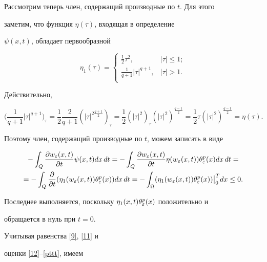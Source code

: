 \begin{pf}
Рассмотрим теперь член, содержащий производные по $t$. Для этого


заметим, что функция $\eta(\tau)$, входящая в определение


$\psi(x,t)$, обладает первообразной


$$


\eta_1(\tau)=


\begin{cases}


\frac{1}{2}\tau^2,& |\tau| \le 1; \\


\frac{1}{q+1}|\tau|^{q+1},& |\tau| > 1.\\


\end{cases}


$$


Действительно,


$$


\bigg(\frac{1}{q+1}|\tau|^{q+1}\bigg)_\tau=


\frac{1}{2}\frac{2}{q+1}(|\tau|^{2\frac{q+1}{2}})_\tau


=\frac{1}{2}(|\tau|^2)_\tau(|\tau|^2)^{\frac{q-1}{2}}=


\frac{1}{2}\tau(|\tau|^2)^{\frac{q-1}{2}}=\eta(\tau).


$$


Поэтому член, содержащий производные по $t$, можем записать в виде


\begin{multline}


-\int_{Q}\frac{\dd w_\eps(x,t)}{\dd t}\psi(x,t) dx\,dt


=-\int_{Q}\frac{\dd w_\eps(x,t)}{\dd t}\eta(w_\eps(x,t))\tmp dx\,dt=\\


=-\int_{Q}\frac{\dd}{\dd t} ( \eta_1(w_\eps(x,t))


\tmp) dx\,dt = -\int_{\Omega}(


\eta_1(w_\eps(x,t))\tmp) \big|^{T}_{0} dx\leq 0.


\label{pttt}


\end{multline}


Последнее выполняется, поскольку $\eta_1(x,t)\theta_\varepsilon^{p}(x)$ положительно и


обращается в нуль при $t=0$.


Учитывая равенства \eqref{9}, \eqref{11} и


оценки \eqref{12}--\eqref{pttt}, имеем


\begin{multline}



\end{multline}
\end{pf}
